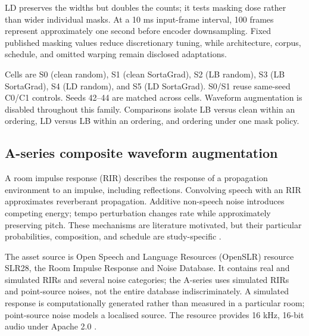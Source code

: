 \documentclass[12pt,a4paper]{report}
\begin{document}
LD preserves the widths but doubles the counts; it tests masking dose rather than wider individual masks. At a 10 ms input-frame interval, 100 frames represent approximately one second before encoder downsampling. Fixed published masking values reduce discretionary tuning, while architecture, corpus, schedule, and omitted warping remain disclosed adaptations.

Cells are S0 (clean random), S1 (clean SortaGrad), S2 (LB random), S3 (LB SortaGrad), S4 (LD random), and S5 (LD SortaGrad). S0/S1 reuse same-seed C0/C1 controls. Seeds 42--44 are matched across cells. Waveform augmentation is disabled throughout this family. Comparisons isolate LB versus clean within an ordering, LD versus LB within an ordering, and ordering under one mask policy.

\subsection{A-series composite waveform augmentation}

A room impulse response (RIR) describes the response of a propagation environment to an impulse, including reflections. Convolving speech with an RIR approximates reverberant propagation. Additive non-speech noise introduces competing energy; tempo perturbation changes rate while approximately preserving pitch. These mechanisms are literature motivated, but their particular probabilities, composition, and schedule are study-specific \citep{Ko2015,Ko2017}.

The asset source is Open Speech and Language Resources (OpenSLR) resource SLR28, the Room Impulse Response and Noise Database. It contains real and simulated RIRs and several noise categories; the A-series uses simulated RIRs and point-source noises, not the entire database indiscriminately. A simulated response is computationally generated rather than measured in a particular room; point-source noise models a localised source. The resource provides 16 kHz, 16-bit audio under Apache 2.0 \citep{SLR28}.
\end{document}
